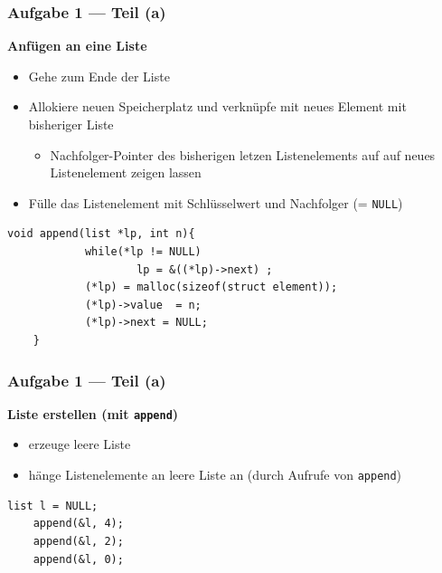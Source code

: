 \documentclass{beamer}
\begin{document}
\begin{frame}[fragile] \frametitle{Aufgabe 1 --- Teil (a)}
	\textbf{Anfügen an eine Liste}
	\begin{itemize}
		\item Gehe zum Ende der Liste
		\item Allokiere neuen Speicherplatz und verknüpfe mit neues Element mit bisheriger Liste
		\begin{itemize}
			\item Nachfolger-Pointer des bisherigen letzen Listenelements auf auf neues Listenelement zeigen lassen
		\end{itemize}
		\item Fülle das Listenelement mit Schlüsselwert und Nachfolger (= \texttt{NULL})
	\end{itemize}

	\pause
	
	\begin{lstlisting}[style=notebook]
	void append(list *lp, int n){
			while(*lp != NULL) 
					lp = &((*lp)->next) ; 
			(*lp) = malloc(sizeof(struct element)); 
			(*lp)->value  = n;   
			(*lp)->next = NULL; 
	}
	\end{lstlisting}
\end{frame}

\begin{frame}[fragile] \frametitle{Aufgabe 1 --- Teil (a)}
	\textbf{Liste erstellen (mit \texttt{append})}
	\begin{itemize}
		\item erzeuge leere Liste
		\item hänge Listenelemente an leere Liste an (durch Aufrufe von \texttt{append})
	\end{itemize}
	
	\pause
	
	\begin{lstlisting}[style=notebook]
	list l = NULL;
	append(&l, 4);
	append(&l, 2);
	append(&l, 0);
	\end{lstlisting}
\end{frame}
\end{document}
